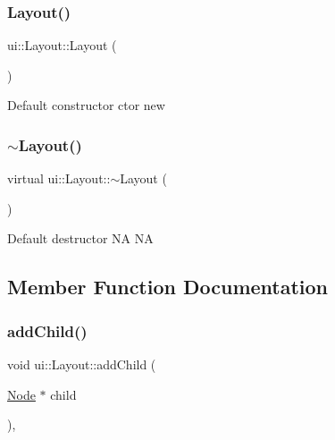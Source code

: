 \subsubsection{\texorpdfstring{Layout()}{Layout()}\hspace{0.1cm}{\footnotesize\ttfamily [2/2]}}
{\footnotesize\ttfamily ui\+::\+Layout\+::\+Layout (\begin{DoxyParamCaption}{ }\end{DoxyParamCaption})}

Default constructor  ctor  new \mbox{\label{classui_1_1Layout_a82d4cf609145d7ee5858ec7eb68acfbb}} 
\subsubsection{\texorpdfstring{$\sim$\+Layout()}{~Layout()}\hspace{0.1cm}{\footnotesize\ttfamily [2/2]}}
{\footnotesize\ttfamily virtual ui\+::\+Layout\+::$\sim$\+Layout (\begin{DoxyParamCaption}{ }\end{DoxyParamCaption})\hspace{0.3cm}{\ttfamily [virtual]}}

Default destructor  NA  NA 

\subsection{Member Function Documentation}
\mbox{\label{classui_1_1Layout_a5d22ede0db71db1d5b597207f1c2013e}} 
\subsubsection{\texorpdfstring{add\+Child()}{addChild()}\hspace{0.1cm}{\footnotesize\ttfamily [1/8]}}
{\footnotesize\ttfamily void ui\+::\+Layout\+::add\+Child (\begin{DoxyParamCaption}\item[{\hyperlink{classNode}{Node} $\ast$}]{child }\end{DoxyParamCaption})\hspace{0.3cm}{\ttfamily [override]}, {\ttfamily [virtual]}}

